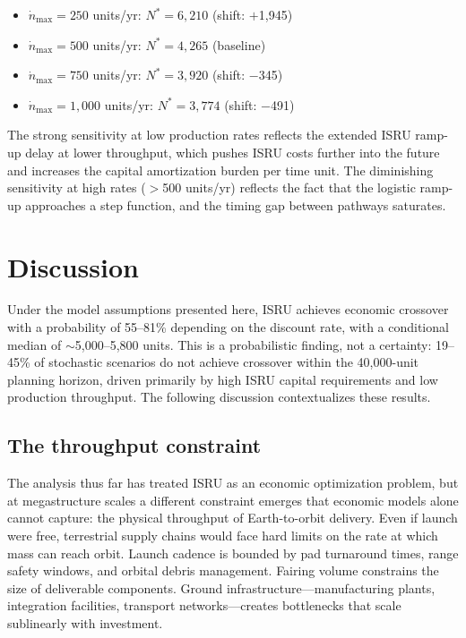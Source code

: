 \documentclass[preprint,12pt]{elsarticle}
\begin{document}
\begin{itemize}
\item $\dot{n}_{\max} = 250$ units/yr: $N^* = 6{,}210$ (shift: $+$1{,}945)
\item $\dot{n}_{\max} = 500$ units/yr: $N^* = 4{,}265$ (baseline)
\item $\dot{n}_{\max} = 750$ units/yr: $N^* = 3{,}920$ (shift: $-$345)
\item $\dot{n}_{\max} = 1{,}000$ units/yr: $N^* = 3{,}774$ (shift: $-$491)
\end{itemize}

The strong sensitivity at low production rates reflects the extended ISRU ramp-up delay at lower throughput, which pushes ISRU costs further into the future and increases the capital amortization burden per time unit. The diminishing sensitivity at high rates ($>$500 units/yr) reflects the fact that the logistic ramp-up approaches a step function, and the timing gap between pathways saturates.

\section{Discussion}
\label{sec:discussion}

Under the model assumptions presented here, ISRU achieves economic crossover with a probability of 55--81\% depending on the discount rate, with a conditional median of $\sim$5{,}000--5{,}800 units. This is a probabilistic finding, not a certainty: 19--45\% of stochastic scenarios do not achieve crossover within the 40{,}000-unit planning horizon, driven primarily by high ISRU capital requirements and low production throughput. The following discussion contextualizes these results.

\subsection{The throughput constraint}

The analysis thus far has treated ISRU as an economic optimization problem, but at megastructure scales a different constraint emerges that economic models alone cannot capture: the physical throughput of Earth-to-orbit delivery. Even if launch were free, terrestrial supply chains would face hard limits on the rate at which mass can reach orbit. Launch cadence is bounded by pad turnaround times, range safety windows, and orbital debris management. Fairing volume constrains the size of deliverable components. Ground infrastructure---manufacturing plants, integration facilities, transport networks---creates bottlenecks that scale sublinearly with investment.
\end{document}
